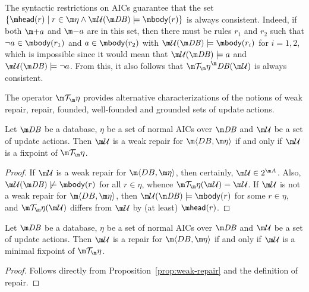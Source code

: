 The syntactic restrictions on AICs guarantee that the set $\{\head(r)\mid r\in \aics \land \UU(\db)\models\body(r)\}$ is always consistent. 
Indeed, if both $\add a$ and $\remove a$ are in this set, then there must be rules $r_1$ and $r_2$ such that $\neg a\in\body(r_1)$ and $a\in\body(r_2)$ with $\UU(\db)\models\body(r_i)$ for $i=1,2$, which is impossible since it would mean that $\UU(\db)\models a$ and $\UU(\db)\models \lnot a$.
From this, it also follows that $\Op^\db(\UU)$ is always consistent. 

The operator $\Op$ provides alternative characterizations of the notions of weak repair, repair, founded, well-founded and grounded sets of update actions.



\begin{proposition}
  \label{prop:weak-repair}
  Let $\db$ be a database, $\eta$ be a set of normal AICs over $\db$ and $\UU$ be a set of update actions.
  Then $\UU$ is a weak repair for $\fulldb$ if and only if $\UU$ is a fixpoint of $\Op$.
\end{proposition}
\begin{proof}
  If $\UU$ is a weak repair for $\fulldb$, then certainly, $\UU\in 2^{\acts}$. Also, $\UU(\db)\not\models\body(r)$ for all $r\in\eta$, whence $\Op(\UU)=\UU$.
  If $\UU$ is not a weak repair for $\fulldb$, then $\UU(\db)\models\body(r)$ for some $r\in\eta$, and $\Op(\UU)$ differs from $\UU$ by (at least) $\head(r)$.
\end{proof}

\begin{proposition}
  \label{prop:repair}
  Let $\db$ be a database, $\eta$ be a set of normal AICs over $\db$ and $\UU$ be a set of update actions.
  Then $\UU$ is a repair for $\fulldb$ if and only if $\UU$ is a minimal fixpoint of $\Op$.
\end{proposition}
\begin{proof}
  Follows directly from Proposition~\ref{prop:weak-repair} and the definition of repair.
\end{proof}

